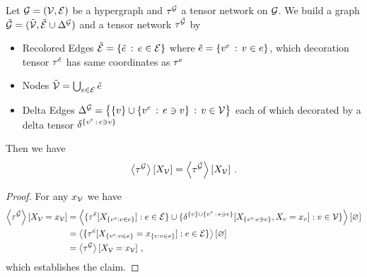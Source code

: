 \begin{lemma}
    \label{lem:deltification}
    Let $\mathcal{G}=(\mathcal{V},\mathcal{E})$ be a hypergraph and $\tau^{\mathcal{G}}$ a tensor network on $\mathcal{G}$.
    We build a graph $\tilde{\mathcal{G}}=(\tilde{\mathcal{V}},\tilde{\mathcal{E}}\cup\Delta^{\mathcal{G}})$ and a tensor network $\tau^{\tilde{\mathcal{G}}}$ by %
    \begin{itemize}
        \item Recolored Edges $\tilde{\mathcal{E}} = \{\tilde{e} \,:\, e\in \mathcal{E}\}$ where $\tilde{e} = \{v^{e} \,:\, v\in e\}$, which decoration tensor $\tau^{\tilde{e}}$ has same coordinates as $\tau^{e}$
        \item Nodes $\tilde{\mathcal{V}} = \bigcup_{e\in\mathcal{E}}\tilde{e}$ %
        \item Delta Edges $\Delta^{\mathcal{G}} =  \big\{ \{v\} \cup \{v^{e} \,:\, e\ni v \} \,:\, v\in\mathcal{V} \big\} $ each of which decorated by a delta tensor $\delta^{\{v^{e} \,:\, e\ni v \}}$
    \end{itemize}
    Then we have
    \begin{align*}
        \left\langle \tau^{\mathcal{G}}\right\rangle \left[ X_{\mathcal{V}} \right] =  \left\langle \tau^{\tilde{\mathcal{G}}}\right\rangle \left[ X_{\mathcal{V}} \right]  \, .
    \end{align*}
\end{lemma}
\begin{proof}
    For any $x_{\mathcal{V}}$ we have
    \begin{align*}
        \left\langle \tau^{\tilde{\mathcal{G}}}\right\rangle \left[ X_{\mathcal{V}}=x_{\mathcal{V}} \right]
        & = \left\langle \{\tau^{\tilde{e}}[X_{\{v^{e} : v\in e\}}] : e \in \mathcal{E} \}\cup
        \{\delta^{\{v\} \cup \{v^{e} \,:\, e\ni v \}}[X_{\{v^{e} : e\ni v \}}, X_{v}=x_{v} ]  : v\in\mathcal{V} \}
        \right\rangle \left[ \varnothing \right] \\
        & =  \left\langle \{\tau^{\tilde{e}}[X_{\{v^{e} : v\in e\}} = x_{\{v : v\in e\}} ] : e \in \mathcal{E} \}
        \right\rangle \left[ \varnothing \right] \\
        & = \left\langle \tau^{\mathcal{G}}\right\rangle \left[ X_{\mathcal{V}}=x_{\mathcal{V}} \right] \, ,
    \end{align*}
    which establishes the claim.
\end{proof}


